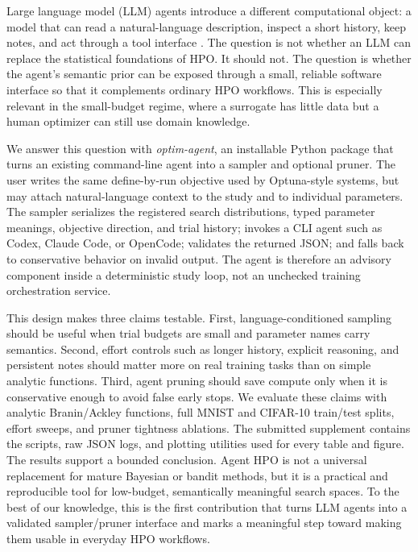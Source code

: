 \documentclass[letterpaper]{article}
\begin{document}
Large language model (LLM) agents introduce a different computational object:
a model that can read a natural-language description, inspect a short history,
keep notes, and act through a tool interface
\cite{brown2020language,yao2023react,schick2023toolformer,wang2024surveyagents}.
The question is not whether an LLM can replace the statistical foundations of HPO. It should not.
The question is whether the agent's semantic prior can be exposed through a
small, reliable software interface so that it complements ordinary HPO
workflows. This is especially relevant in the small-budget regime, where a
surrogate has little data but a human optimizer can still use domain knowledge.

We answer this question with \emph{optim-agent}, an installable Python package
that turns an existing command-line agent into a sampler and optional pruner.
The user writes the same define-by-run objective used by Optuna-style systems,
but may attach natural-language context to the study and to individual
parameters. The sampler serializes the registered search distributions, typed
parameter meanings, objective direction, and trial history; invokes a CLI agent
such as Codex, Claude Code, or OpenCode; validates the returned JSON; and falls
back to conservative behavior on invalid output. The agent is therefore an
advisory component inside a deterministic study loop, not an unchecked training
orchestration service.

This design makes three claims testable. First, language-conditioned sampling
should be useful when trial budgets are small and parameter names carry
semantics. Second, effort controls such as longer history, explicit reasoning,
and persistent notes should matter more on real training tasks than on simple
analytic functions. Third, agent pruning should save compute only when it is
conservative enough to avoid false early stops. We evaluate these claims with
analytic Branin/Ackley functions, full MNIST and CIFAR-10 train/test splits,
effort sweeps, and pruner tightness ablations. The submitted supplement contains
the scripts, raw JSON logs, and plotting utilities used for every table and
figure. The results support a bounded conclusion. Agent HPO is not a universal
replacement for mature Bayesian or bandit methods, but it is a practical and
reproducible tool for low-budget, semantically meaningful search spaces. To the
best of our knowledge, this is the first contribution that turns LLM agents into
a validated sampler/pruner interface and marks a meaningful step toward making
them usable in everyday HPO workflows.
\end{document}
